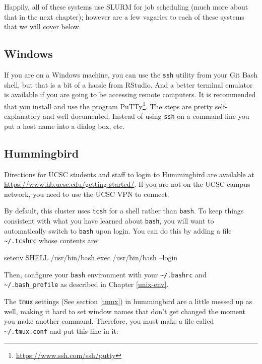 \documentclass[]{krantz}
\makeatletter
\newenvironment{Shaded}{\begin{snugshade}}{\end{snugshade}}
\newcommand{\BuiltInTok}[1]{#1}
\newcommand{\ExtensionTok}[1]{#1}
\newcommand{\NormalTok}[1]{#1}
\renewcommand{\href}[2]{#2\footnote{\url{#1}}}
\newenvironment{kframe}{%
\medskip{}
\setlength{\fboxsep}{.8em}
 \def\at@end@of@kframe{}%
 \ifinner\ifhmode%
  \def\at@end@of@kframe{\end{minipage}}%
  \begin{minipage}{\columnwidth}%
 \fi\fi%
 \def\FrameCommand##1{\hskip\@totalleftmargin \hskip-\fboxsep
 \colorbox{shadecolor}{##1}\hskip-\fboxsep
     \hskip-\linewidth \hskip-\@totalleftmargin \hskip\columnwidth}%
 \MakeFramed {\advance\hsize-\width
   \@totalleftmargin\z@ \linewidth\hsize
   \@setminipage}}%
 {\par\unskip\endMakeFramed%
 \at@end@of@kframe}
\renewenvironment{Shaded}{\begin{kframe}}{\end{kframe}}
\makeatother
\begin{document}
Happily, all of these systems use SLURM for job scheduling (much more about that in the
next chapter); however are a few vagaries to each of these systems that we will cover below.

\hypertarget{windows}{%
\subsection{Windows}\label{windows}}

If you are on a Windows machine, you can use the \texttt{ssh} utility from your Git Bash shell, but
that is a bit of a hassle from RStudio. And a better terminal emulator is available if you
are going to be accessing remote computers. It is recommended that you install and
use the program \href{https://www.ssh.com/ssh/putty}{PuTTy}. The steps are pretty self-explanatory
and well documented. Instead of using \texttt{ssh} on a command line you put a host name into
a dialog box, etc.

\hypertarget{hummingbird}{%
\subsection{Hummingbird}\label{hummingbird}}

Directions for UCSC students and staff to login to Hummingbird are available
at \url{https://www.hb.ucsc.edu/getting-started/}.
If you are not on the UCSC campus network, you need to use the UCSC VPN to connect.

By default, this cluster uses \texttt{tcsh} for a shell rather than \texttt{bash}. To keep things
consistent with what you have learned about \texttt{bash}, you will want to automatically switch
to \texttt{bash} upon login. You can do this by adding a file \texttt{\textasciitilde{}/.tcshrc} whose contents are:

\begin{Shaded}
\begin{Highlighting}[]
\ExtensionTok{setenv}\NormalTok{ SHELL /usr/bin/bash}
\BuiltInTok{exec}\NormalTok{ /usr/bin/bash --login}
\end{Highlighting}
\end{Shaded}

Then, configure your \texttt{bash} environment with your \texttt{\textasciitilde{}/.bashrc} and \texttt{\textasciitilde{}/.bash\_profile} as
described in Chapter \ref{unix-env}.

The \texttt{tmux} settings (See section \ref{tmux}) in hummingbird are a little messed up as well, making
it hard to set window names that don't get changed the moment you make another command. Therefore,
you must make a file called \texttt{\textasciitilde{}/.tmux.conf} and put this line in it:
\end{document}
